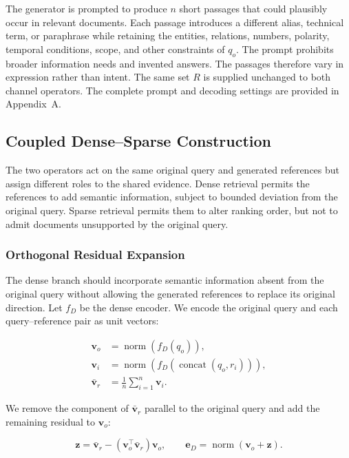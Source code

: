 The generator is prompted to produce \(n\) short passages that could plausibly occur in relevant documents. Each passage introduces a different alias, technical term, or paraphrase while retaining the entities, relations, numbers, polarity, temporal conditions, scope, and other constraints of \(q_o\). The prompt prohibits broader information needs and invented answers. The passages therefore vary in expression rather than intent. The same set \(R\) is supplied unchanged to both channel operators. The complete prompt and decoding settings are provided in Appendix~A.

\subsection{Coupled Dense--Sparse Construction}

\label{coupled-densesparse-construction}

The two operators act on the same original query and generated references but assign different roles to the shared evidence. Dense retrieval permits the references to add semantic information, subject to bounded deviation from the original query. Sparse retrieval permits them to alter ranking order, but not to admit documents unsupported by the original query.

\subsubsection{Orthogonal Residual Expansion}

\label{orthogonal-residual-expansion}

The dense branch should incorporate semantic information absent from the original query without allowing the generated references to replace its original direction. Let \(f_D\) be the dense encoder. We encode the original query and each query--reference pair as unit vectors:

\[\begin{aligned}
\mathbf v_o&=\operatorname{norm}(f_D(q_o)),\\
\mathbf v_i&=\operatorname{norm}
\!\left(f_D(\operatorname{concat}(q_o,r_i))\right),\\
\bar{\mathbf v}_r&=\frac{1}{n}\sum_{i=1}^{n}\mathbf v_i .
\end{aligned}\]

We remove the component of \(\bar{\mathbf v}_r\) parallel to the original query and add the remaining residual to \(\mathbf v_o\):

\[\mathbf z=
\bar{\mathbf v}_r-
(\mathbf v_o^\top\bar{\mathbf v}_r)\mathbf v_o,
\qquad
\mathbf e_D=\operatorname{norm}(\mathbf v_o+\mathbf z).\]

